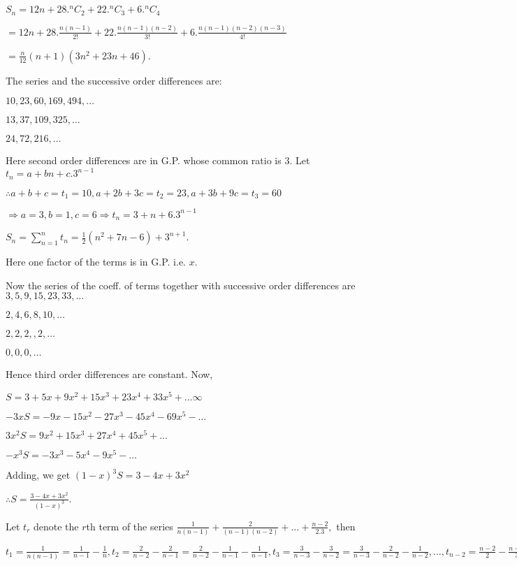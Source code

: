   $S_n = 12n + 28.{}^nC_2 + 22.{}^nC_3 + 6.{}^nC_4$

  $= 12n + 28.\frac{n(n - 1)}{2!} + 22.\frac{n(n - 1)(n - 2)}{3!} + 6.\frac{n(n - 1)(n - 2)(n - 3)}{4!}$

  $= \frac{n}{12}(n + 1)(3n^2 + 23n + 46)$.
\item The series and the successive order differences are:

  $10, 23, 60, 169, 494, \ldots$

  $13, 37, 109, 325, \ldots$

  $24, 72, 216, \ldots$

  Here second order differences are in G.P. whose common ratio is $3.$ Let $t_n = a + bn + c.3^{n - 1}$

  $\therefore a + b + c = t_1 = 10, a + 2b + 3c = t_2 = 23, a + 3b + 9c = t_3 = 60$

  $\Rightarrow a = 3, b = 1, c = 6\Rightarrow t_n = 3 + n + 6.3^{n - 1}$

  $S_n = \displaystyle\sum_{n = 1}^n t_n = \frac{1}{2}(n^2 + 7n - 6) + 3^{n + 1}$.
\item Here one factor of the terms is in G.P. i.e. $x.$

  Now the series of the coeff. of terms together with successive order differences are
  $3, 5, 9, 15, 23, 33, \ldots$

  $2, 4, 6, 8, 10, \ldots$

  $2, 2, 2, ,2, \ldots$

  $0, 0, 0, \ldots$

  Hence third order differences are constant. Now,

  $S = 3 + 5x + 9x^2 + 15x^3 + 23x^4 + 33x^5 + \ldots \infty$

  $-3xS = -9x - 15x^2 - 27x^3 - 45x^4 - 69x^5 -\ldots$

  $3x^2S = 9x^2 + 15x^3 + 27x^4 + 45x^5 + \ldots$

  $-x^3S = -3x^3 - 5x^4 - 9x^5 - \ldots$

  Adding, we get $(1 - x)^3S = 3 - 4x + 3x^2$

  $\therefore S = \frac{3 - 4x + 3x^2}{(1 - x)^3}$.
\item Let $t_r$ denote the $r$th term of the series $\frac{1}{n(n - 1)} + \frac{2}{(n - 1)(n - 2)} + \ldots +
  \frac{n - 2}{2.3},$ then

  $t_1 = \frac{1}{n(n - 1)} = \frac{1}{n - 1} - \frac{1}{n}, t_2 = \frac{2}{n - 2} - \frac{2}{n - 1} =
  \frac{2}{n - 2} - \frac{1}{n - 1} - \frac{1}{n - 1}, t_3 = \frac{3}{n - 3} - \frac{3}{n - 2} = \frac{3}{n
    - 3} - \frac{2}{n - 2} - \frac{1}{n - 2}, \ldots, t_{n - 2} = \frac{n - 2}{2} - \frac{n - 2}{3} =
  \frac{n - 2}{2} - \frac{n - 3}{3} - \frac{1}{3}$

